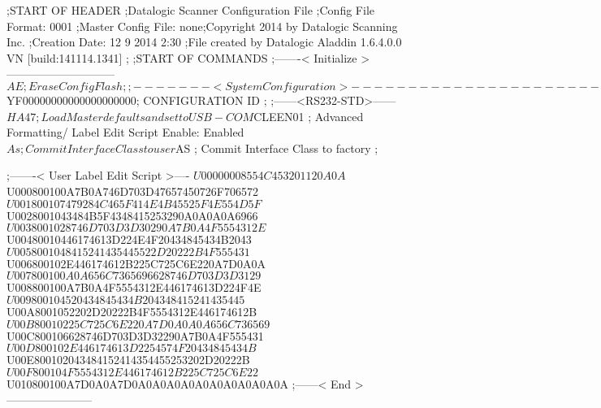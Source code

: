 ;START OF HEADER
;Datalogic Scanner Configuration File
;Config File Format: 0001
;Master Config File: none;Copyright 2014 by Datalogic Scanning Inc.
;Creation Date: 12 9 2014 2:30
;File created by Datalogic Aladdin 1.6.4.0.0 VN [build:141114.1341]
;
;START OF COMMANDS
;-------< Initialize >-----------------------------
$AE                 ; Erase Config Flash
;
;-------< System Configuration >-------------------------------
$YF00000000000000000000; CONFIGURATION ID
;
;------<RS232-STD>------
$HA47               ; Load Master defaults and set to USB-COM
$CLEEN01            ; Advanced Formatting/ Label Edit Script Enable: Enabled
$As                 ; Commit Interface Class to user
$AS                 ; Commit Interface Class to factory
;

;-------< User Label Edit Script >----
$U00000008554C453201120A0A
$U000800100A7B0A746D703D47657450726F706572
$U001800107479284C465F414E4B45525F4E554D5F
$U0028001043484B5F4348415253290A0A0A0A6966
$U0038001028746D703D3D30290A7B0A4F5554312E
$U00480010446174613D224E4F20434845434B2043
$U0058001048415241435445522D20222B4F555431
$U006800102E446174612B225C725C6E220A7D0A0A
$U007800100A0A656C7365696628746D703D3D3129
$U008800100A7B0A4F5554312E446174613D224F4E
$U009800104520434845434B204348415241435445
$U00A8001052202D20222B4F5554312E446174612B
$U00B80010225C725C6E220A7D0A0A0A656C736569
$U00C800106628746D703D3D32290A7B0A4F555431
$U00D800102E446174613D2254574F20434845434B
$U00E800102043484152414354455253202D20222B
$U00F800104F5554312E446174612B225C725C6E22
$U010800100A7D0A0A7D0A0A0A0A0A0A0A0A0A0A0A
;------< End >-----------------------
